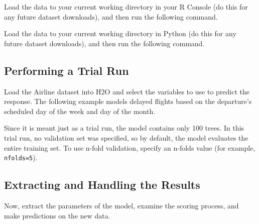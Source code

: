 \waterExampleInR
Load the data to your current working directory in your R Console (do this for any future dataset downloads), and then run the following command.


\medskip
\waterExampleInPython
Load the data to your current working directory in Python (do this for any future dataset downloads), and then run the following command.




\subsection{Performing a Trial Run}
Load the Airline dataset into H2O and select the variables to use to predict  the response. The following example models delayed flights based on the departure's scheduled day of the week and day of the month.

\waterExampleInR



\waterExampleInPython



Since it is meant just as a trial run, the model contains only 100 trees. In this trial run, no validation set was
specified, so by default, the model evaluates the entire training set.  To use n-fold validation, specify an n-folds value (for example, \texttt{nfolds=5}).

\subsection{Extracting and Handling the Results}

Now, extract the parameters of the model, examine the scoring process, and make predictions on the new data.

\begin{minipage}{\textwidth}

\waterExampleInR

\end{minipage}

\begin{minipage}{\textwidth}
\waterExampleInPython

\end{minipage}

